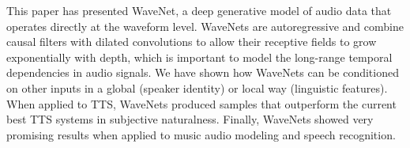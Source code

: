 This paper has presented WaveNet, a deep generative model of audio data that operates directly at the waveform level. WaveNets are autoregressive and combine causal filters with dilated convolutions to allow their receptive fields to grow exponentially with depth, which is important to model the long-range temporal dependencies in audio signals. We have shown how WaveNets can be conditioned on other inputs in a global (\eg speaker identity) or local way (\eg linguistic features). When applied to TTS, WaveNets produced samples that outperform the current best TTS systems in subjective naturalness. Finally, WaveNets showed very promising results when applied to music audio modeling and speech recognition.
